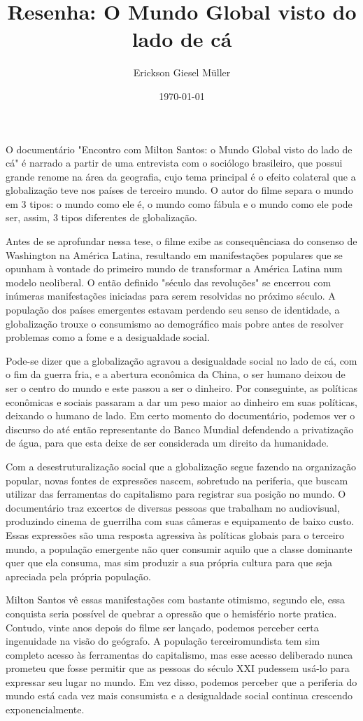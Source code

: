 \documentclass[12pt, a4paper]{article}
\title{Resenha: O Mundo Global visto do lado de cá}
\author{Erickson Giesel Müller}
\date{\today}
\begin{document}
\maketitle
\thispagestyle{empty} %

	O documentário "Encontro com Milton Santos: o Mundo Global visto do lado de cá" é narrado a partir de uma entrevista com o sociólogo brasileiro, que possui grande renome na área da geografia, cujo tema principal é o efeito colateral que a globalização teve nos países de terceiro mundo. O autor do filme separa o mundo em 3 tipos: o mundo como ele é, o mundo como fábula e o mundo como ele pode ser, assim, 3 tipos diferentes de globalização.

	Antes de se aprofundar nessa tese, o filme exibe as consequênciasa do consenso de Washington na América Latina, resultando em manifestações populares que se opunham à vontade do primeiro mundo de transformar a América Latina num modelo neoliberal. O então definido "século das revoluções" se encerrou com inúmeras manifestações iniciadas para serem resolvidas no próximo século. A população dos países emergentes estavam perdendo seu senso de identidade, a globalização trouxe o consumismo ao demográfico mais pobre antes de resolver problemas como a fome e a desigualdade social.

	Pode-se dizer que a globalização agravou a desigualdade social no lado de cá, com o fim da guerra fria, e a abertura econômica da China, o ser humano deixou de ser o centro do mundo e este passou a ser o dinheiro. Por conseguinte, as políticas econômicas e sociais passaram a dar um peso maior ao dinheiro em suas políticas, deixando o humano de lado. Em certo momento do documentário, podemos ver o discurso do até então representante do Banco Mundial defendendo a privatização de água, para que esta deixe de ser considerada um direito da humanidade.

	Com a desestruturalização social que a globalização segue fazendo na organização popular, novas fontes de expressões nascem, sobretudo na periferia, que buscam utilizar das ferramentas do capitalismo para registrar sua posição no mundo. O documentário traz excertos de diversas pessoas que trabalham no audiovisual, produzindo cinema de guerrilha com suas câmeras e equipamento de baixo custo. Essas expressões são uma resposta agressiva às políticas globais para o terceiro mundo, a população emergente não quer consumir aquilo que a classe dominante quer que ela consuma, mas sim produzir a sua própria cultura para que seja apreciada pela própria população.

	Milton Santos vê essas manifestações com bastante otimismo, segundo ele, essa conquista seria possível de quebrar a opressão que o hemisfério norte pratica. Contudo, vinte anos depois do filme ser lançado, podemos perceber certa ingenuidade na visão do geógrafo. A população terceiromundista tem sim completo acesso às ferramentas do capitalismo, mas esse acesso deliberado nunca prometeu que fosse permitir que as pessoas do século XXI pudessem usá-lo para expressar seu lugar no mundo. Em vez disso, podemos perceber que a periferia do mundo está cada vez mais consumista e a desigualdade social continua crescendo exponencialmente.
\end{document}
